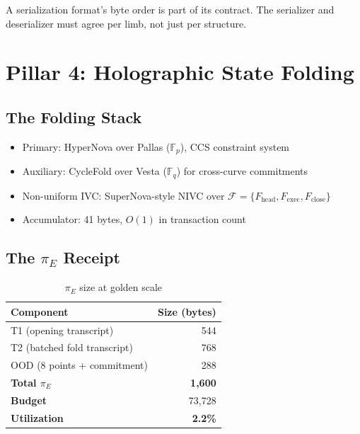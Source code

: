 \documentclass[11pt, a4paper]{article}
\begin{document}
\begin{law}[CA-R202]
A serialization format's byte order is part of its contract. The serializer and deserializer must agree per limb, not just per structure.
\end{law}

\section{Pillar 4: Holographic State Folding}

\subsection{The Folding Stack}

\begin{itemize}
\item Primary: HyperNova over Pallas ($\mathbb{F}_p$), CCS constraint system
\item Auxiliary: CycleFold over Vesta ($\mathbb{F}_q$) for cross-curve commitments
\item Non-uniform IVC: SuperNova-style NIVC over $\mathcal{F} = \{F_{\text{head}}, F_{\text{exec}}, F_{\text{close}}\}$ \item Accumulator: 41 bytes, $O(1)$ in transaction count
\end{itemize}

\subsection{The $\pi_E$ Receipt}

\begin{table}[h]
\centering
\caption{$\pi_E$ size at golden scale}
\begin{tabular}{lr}
\toprule
\textbf{Component} & \textbf{Size (bytes)} \\
\midrule
T1 (opening transcript) & 544 \\
T2 (batched fold transcript) & 768 \\
OOD (8 points + commitment) & 288 \\
\midrule
\textbf{Total $\pi_E$} & \textbf{1{,}600} \\
\textbf{Budget} & 73{,}728 \\
\textbf{Utilization} & \textbf{2.2\%} \\
\bottomrule
\end{tabular}
\end{table}
\end{document}
